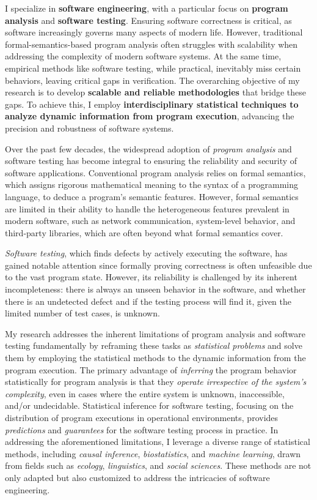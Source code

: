 \documentclass{article}
\begin{document}
\thispagestyle{firstpage} %


\noindent 
I specialize in \textbf{software engineering}, with a particular focus on \textbf{program analysis} and \textbf{software testing}. Ensuring software correctness is critical, as software increasingly governs many aspects of modern life. However, traditional formal-semantics-based program analysis often struggles with scalability when addressing the complexity of modern software systems. At the same time, empirical methods like software testing, while practical, inevitably miss certain behaviors, leaving critical gaps in verification. The overarching objective of my research is to develop \textbf{\color{blue}scalable and reliable methodologies} that bridge these gaps. To achieve this, I employ \textbf{\color{blue}interdisciplinary statistical techniques to analyze dynamic information from program execution}, advancing the precision and robustness of software systems.

Over the past few decades, the widespread adoption of \emph{program analysis} and software testing has become integral to ensuring the reliability and security of software applications. Conventional program analysis relies on formal semantics, which assigns rigorous mathematical meaning to the syntax of a programming language, to deduce a program's semantic features. However, formal semantics are limited in their ability to handle the heterogeneous features prevalent in modern software, such as network communication, system-level behavior, and third-party libraries, which are often beyond what formal semantics cover.

\emph{Software testing}, which finds defects by actively executing the software, has gained notable attention since formally proving correctness is often unfeasible due to the vast program state. However, its reliability is challenged by its inherent incompleteness: there is always an unseen behavior in the software, and whether there is an undetected defect and if the testing process will find it, given the limited number of test cases, is unknown.

My research addresses the inherent limitations of program analysis and software testing fundamentally by reframing these tasks as \emph{statistical problems} and solve them by employing the statistical methods to the dynamic information from the program execution. The primary advantage of \emph{inferring} the program behavior statistically for program analysis is that they \emph{operate irrespective of the system's complexity}, even in cases where the entire system is unknown, inaccessible, and/or undecidable. Statistical inference for software testing, focusing on the distribution of program executions in operational environments, provides \emph{predictions} and \emph{guarantees} for the software testing process in practice.
In addressing the aforementioned limitations, I leverage a diverse range of statistical methods, including \emph{causal inference}, \emph{biostatistics}, and \emph{machine learning}, drawn from fields such as \emph{ecology}, \emph{linguistics}, and \emph{social sciences}. These methods are not only adapted but also customized to address the intricacies of software engineering. 
\end{document}
